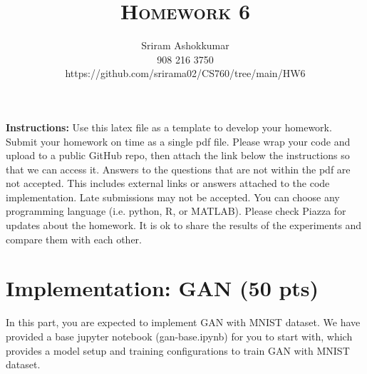 \documentclass[a4paper]{article}
\title{\textsc{Homework 6}} %
\author{
	Sriram Ashokkumar \\
	908 216 3750\\
	https://github.com/srirama02/CS760/tree/main/HW6
}
\date{}
\theoremstyle{definition}
\begin{document}
	
	\maketitle 
	
        \textbf{Instructions:}
        Use this latex file as a template to develop your homework. Submit your homework on time as a single pdf file. Please wrap your code and upload to a public GitHub repo, then attach the link below the instructions so that we can access it. Answers to the questions that are not within the pdf are not accepted. This includes external links or answers attached to the code implementation. Late submissions may not be accepted. You can choose any programming language (i.e. python, R, or MATLAB). Please check Piazza for updates about the homework. It is ok to share the results of the experiments and compare them with each other.
        \vspace{0.1in}
	
	\section{Implementation: GAN (50 pts)}
	In this part, you are expected to implement GAN with MNIST dataset. We have provided a base jupyter notebook (gan-base.ipynb) for you to start with, which provides a model setup and training configurations to train GAN with MNIST dataset.
	
\end{document}
